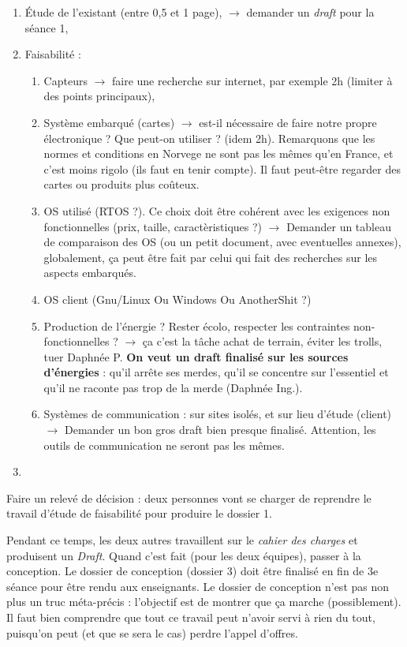 \begin{enumerate}
	\item Étude de l'existant (entre 0,5 et 1 page), $\rightarrow$ demander un
\textit{draft} pour la séance 1,
	\item Faisabilité :
	\begin{enumerate}
		\item Capteurs $\rightarrow$ faire une recherche sur internet, par
exemple 2h (limiter à des points principaux),
		\item Système embarqué (cartes) $\rightarrow$ est-il nécessaire de
faire notre propre électronique ? Que peut-on utiliser ? (idem 2h). Remarquons
que les normes et conditions en Norvege ne sont pas les mêmes qu'en France, et
c'est moins rigolo (ils faut en tenir compte). Il faut peut-être regarder des
cartes ou produits plus coûteux.
		\item OS utilisé (RTOS ?). Ce choix doit être
cohérent avec les exigences non fonctionnelles (prix, taille, caractèristiques
?) $\rightarrow$ Demander un tableau de comparaison des OS (ou un petit document, avec eventuelles annexes), globalement, ça peut être fait par celui qui fait des recherches sur les aspects embarqués.
		\item OS client (Gnu/Linux Ou Windows Ou AnotherShit ?)
		\item Production de l'énergie ? Rester écolo, respecter les
contraintes non-fonctionnelles ? $\rightarrow$ ça c'est la tâche achat de
terrain, éviter les trolls, tuer Daphnée P. \textbf{On veut un draft finalisé
sur les sources d'énergies} : qu'il arrête ses merdes, qu'il se concentre sur
l'essentiel et qu'il ne raconte pas trop de la merde (Daphnée Ing.).
		\item Systèmes de communication : sur sites isolés, et sur lieu d'étude
(client) $\rightarrow$ Demander un bon gros draft bien presque finalisé.
Attention, les outils de communication ne seront pas les mêmes.
	\end{enumerate}
	\item 
\end{enumerate}

Faire un relevé de décision : deux personnes vont se charger de reprendre le
travail d'étude de faisabilité pour produire le dossier 1.

Pendant ce temps, les deux autres travaillent sur le \textit{cahier des
charges} et produisent un \textit{Draft}. Quand c'est fait (pour les deux
équipes), passer à la conception. Le dossier de conception (dossier 3) doit
être finalisé en fin de 3e séance pour être rendu aux enseignants. Le dossier
de conception n'est pas non plus un truc méta-précis : l'objectif est de
montrer que ça marche (possiblement). Il faut bien comprendre que tout ce
travail peut n'avoir servi à rien du tout, puisqu'on peut (et que se sera le
cas) perdre l'appel d'offres.

